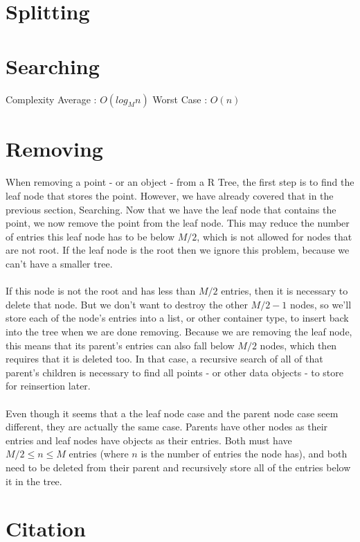 \documentclass{article}
\begin{document}
\section{Splitting} 

\section{Searching}
Complexity
Average : $O(log_Mn)$
Worst Case : $O(n)$

\section{Removing}
\paragraph{}
When removing a point - or an object - from a R Tree, the first step is to find the leaf node that stores the point.
However, we have already covered that in the previous section, Searching. Now that we have the leaf node that contains
the point, we now remove the point from the leaf node. This may reduce the number of entries this leaf node has to be below
$M/2$, which is not allowed for nodes that are not root. If the leaf node is the root then we ignore this problem, because
we can't have a smaller tree.
\paragraph{}
If this node is not the root and has less than $M/2$ entries, then it is necessary to delete that node. But we don't want to destroy
the other $M/2 - 1$ nodes, so we'll store each of the node's entries into a list, or other container type, to insert back into
the tree when we are done removing. Because we are removing the leaf node, this means that its parent's entries can also fall below
$M/2$ nodes, which then requires that it is deleted too. In that case, a recursive search of all of that parent's children is necessary
to find all points - or other data objects - to store for reinsertion later.
\paragraph{}
Even though it seems that a the leaf node case and the parent node case seem different, they are actually the same case. Parents have
other nodes as their entries and leaf nodes have objects as their entries. Both must have $M/2 \le n \le M$ entries (where $n$ is the number
of entries the node has), and both need to be deleted from their parent and recursively store all of the entries below it in the tree.

\section{Citation}


\end{document}
